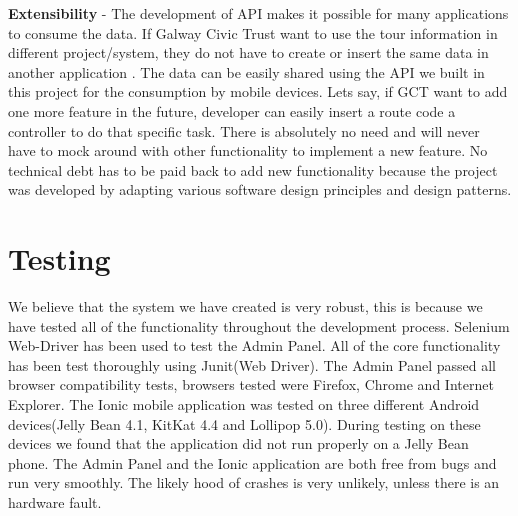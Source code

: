     \textbf{Extensibility} - The development of API makes it possible for many applications to consume the data. If Galway Civic Trust want to use the tour information in different project/system, they do not have to create or insert the same data in another application . The data can be easily shared using the API we built in this project for the consumption by mobile devices.
    Lets say, if GCT want to add one more feature in the future, developer can easily insert a route code a controller to do that specific task. There is absolutely no need and will never have to mock around with other functionality to implement a new feature. No technical debt has to be paid back to add new functionality because the project was developed by adapting various software design principles and design patterns. 
    
	\section{Testing}
	We believe that the system we have created is very robust, this is because we have tested all of the functionality throughout the development process. Selenium Web-Driver has been used to test the Admin Panel. All of the core functionality has been test thoroughly using Junit(Web Driver). The Admin Panel passed all browser compatibility tests, browsers tested were Firefox, Chrome and Internet Explorer. The Ionic mobile application was tested on three different Android devices(Jelly Bean 4.1, KitKat 4.4 and Lollipop 5.0). During testing on these devices we found that the application did not run properly on a Jelly Bean phone.
	The Admin Panel and the Ionic application are both free from bugs and run very smoothly. The likely hood of crashes is very unlikely, unless there is an hardware fault.
	
